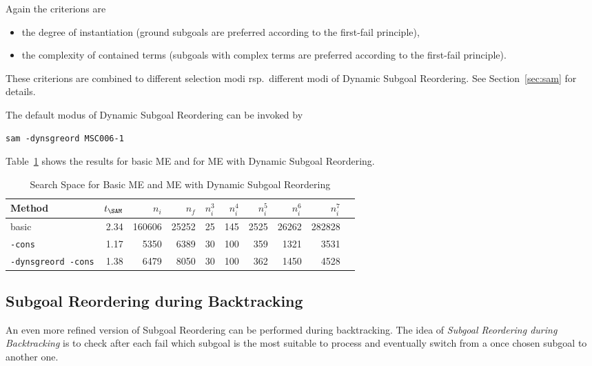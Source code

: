Again the criterions are 
\begin{itemize}
\item the degree of instantiation (ground subgoals are preferred
	according to the first-fail principle),
\item the complexity of contained terms (subgoals with complex
      terms are preferred according to the first-fail principle).  
\end{itemize}
These criterions are combined to different selection modi rsp.\
different modi of Dynamic Subgoal Reordering. See
Section~\ref{sec:sam} for details. 

The default modus of Dynamic Subgoal Reordering can be invoked by
\begin{center}
\begin{verbatim}
sam -dynsgreord MSC006-1
\end{verbatim}
\end{center}

Table~\ref{tab:tut2:results.dynsgreord} shows the results for basic
ME and for ME with Dynamic Subgoal Reordering.

\begin{table}[htb]
\begin{center}
\begin{tabular}{|l|r|r|r||r|r|r|r|r|r|}
\hline
Method & $t_{\SAM}$ & $n_i$ & $n_f$ & 
	$n_i^3$ & $n_i^4$ & $n_i^5$ & $n_i^6$ & $n_i^7$ \\
\hline\hline
basic & 2.34 & 160606 & 25252 &
	25 & 145 & 2525 & 26262 & 282828 \\
\hline
{\tt -cons} & 1.17 & 5350 & 6389 &
	30 & 100 & 359 & 1321 & 3531 \\
\hline
{\tt -dynsgreord -cons} & 1.38 & 6479 & 8050 &
	30 & 100 & 362 & 1450 & 4528 \\
\hline\hline
\end{tabular}
\end{center}
\caption{Search Space for Basic ME and ME with Dynamic Subgoal Reordering} 
\label{tab:tut2:results.dynsgreord}
\end{table}


\subsection{Subgoal Reordering during Backtracking}

An even more refined version of Subgoal Reordering can be performed
during backtracking. The idea of {\em Subgoal Reordering during
Backtracking\/} is to check after each fail which subgoal is the most
suitable to process and eventually switch from a once chosen subgoal
to another one.

